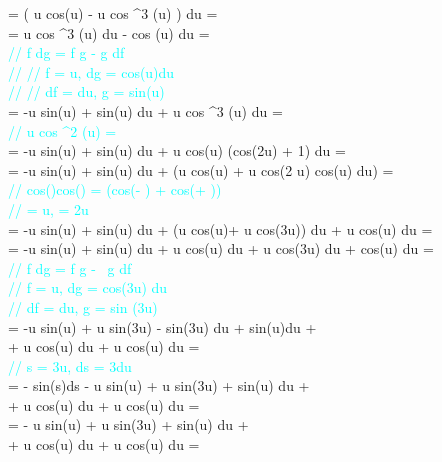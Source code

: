 \documentclass[12pt]{article}
\begin{document}
\begin{description}
{			= \int ( u \cdot cos(u) - u \cdot cos ^3 (u) ) du = \\
			= \int u \cdot cos ^3 (u) du - \int cos (u) du = \\
			\textcolor{Cyan}{// \int f dg = f g - \int g df} \\
			\textcolor{Cyan}{// // f = u, dg = cos(u)du } \\
			\textcolor{Cyan}{// // df = du, g = sin(u) } \\
			= -u sin(u) + \int sin(u) du + \int u \cdot cos ^3 (u) du = \\
			\textcolor{Cyan}{// u \cdot cos ^2 (u) =  } \\
			= -u sin(u) + \int sin(u) du +  \int u \cdot cos(u) (cos(2u) + 1) du = \\
			= -u sin(u) + \int sin(u) du +  \int (u \cdot cos(u) + u \cdot cos(2 u) cos(u) du) = \\
			\textcolor{Cyan}{// cos(\alpha)cos(\beta) = (cos(\alpha - \beta) + cos(\alpha + \beta)) } \\
			\textcolor{Cyan}{// \alpha = u, \beta = 2u} \\
			= -u sin(u) + \int sin(u) du +  \int (u \cdot cos(u)+ u \cdot cos(3u)) du +  \int u \cdot cos(u) du = \\
			= -u sin(u) + \int sin(u) du +  \int u \cdot cos(u) du +  \int u \cdot cos(3u) du +  cos(u) du = \\
			\textcolor{Cyan}{// \int f dg = f g - \ g df } \\
			\textcolor{Cyan}{// f = u, dg = cos(3u) du} \\
			\textcolor{Cyan}{// df = du, g =  sin (3u)} \\
			= -u sin(u) +  u sin(3u) -  \int sin(3u) du + \int sin(u)du + \\
			 + u \cdot cos(u) du + \int u \cdot cos(u) du = \\
			\textcolor{Cyan}{// s = 3u, ds = 3du} \\
			= -  \int sin(s)ds - u sin(u) +  u sin(3u) + \int sin(u) du + \\
			 +  \int u \cdot cos(u) du +  \int u \cdot cos(u) du = \\
			=  - u sin(u) +  u sin(3u) + \int sin(u) du + \\
			 +  \int u \cdot cos(u) du +  \int u \cdot cos(u) du = \\
}
\end{description}
\end{document}
